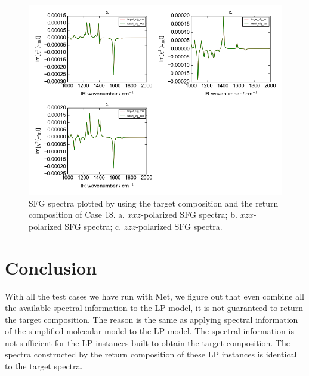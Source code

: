\begin{figure}[!ht] 
\centering
\includegraphics[scale=0.7]{Figures/chapter4_result_target_plotting_500datapoint_sfg_version2.png}
\caption{SFG spectra plotted by using the target composition and the return composition of Case 18. a. $xxz$-polarized SFG spectra; b. $xzx$-polarized SFG spectra; c. $zzz$-polarized SFG spectra.} \label{fig:4.7}
\end{figure} 

\section{Conclusion}
With all the test cases we have run with Met, we figure out that even combine all the available spectral information to the LP model, it is not guaranteed to return the target composition. The reason is the same as applying spectral information of the simplified molecular model to the LP model. The spectral information is not sufficient for the LP instances built to obtain the  target composition. The spectra constructed by the return composition of these LP instances is identical to the target spectra. 








